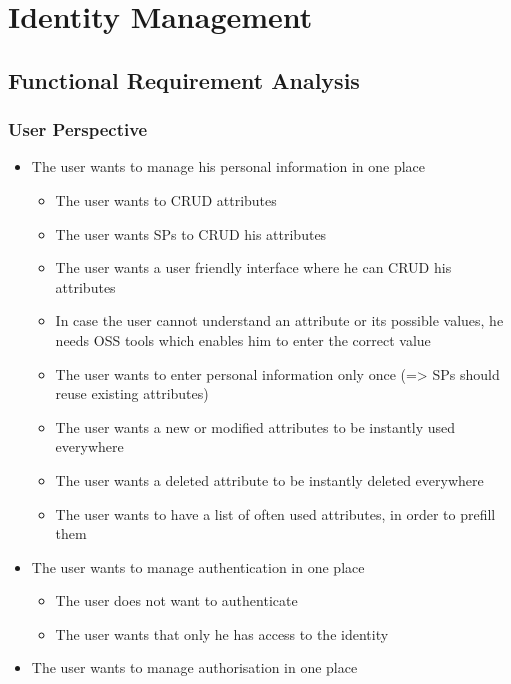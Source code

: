 \documentclass[
     12pt,         %
     a4paper,      %
     BCOR=10mm,version=first,     %
     DIV=14,version=first,        %
     ]{scrreprt}
\begin{document}
\chapter{Identity Management}

\section{Functional Requirement Analysis}

\subsection{User Perspective}

\begin{itemize}
    \item The user wants to manage his personal information in one place
    \begin{itemize}
        \item The user wants to CRUD attributes
        \item The user wants SPs to CRUD his attributes
        \item The user wants a user friendly interface where he can CRUD his attributes
        \item In case the user cannot understand an attribute or its possible values, he needs OSS tools which enables him to enter the correct value
        \item The user wants to enter personal information only once (=> SPs should reuse existing attributes)
        \item The user wants a new or modified attributes to be instantly used everywhere
        \item The user wants a deleted attribute to be instantly deleted everywhere
        \item The user wants to have a list of often used attributes, in order to prefill them
    \end{itemize}
    \item The user wants to manage authentication in one place
    \begin{itemize}
        \item The user does not want to authenticate
        \item The user wants that only he has access to the identity
    \end{itemize}
    \item The user wants to manage authorisation in one place
    \begin{itemize}

\end{itemize}
\end{itemize}
\end{document}
